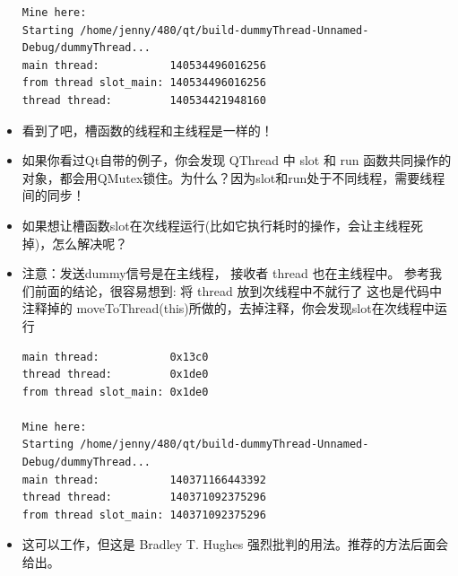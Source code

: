 \documentclass[9pt,b5paper]{article}
\begin{document}
\begin{itemize}
\begin{lstlisting}
Mine here:
Starting /home/jenny/480/qt/build-dummyThread-Unnamed-Debug/dummyThread...
main thread:           140534496016256 
from thread slot_main: 140534496016256 
thread thread:         140534421948160
\end{lstlisting}
\item 看到了吧，槽函数的线程和主线程是一样的！
\item 如果你看过Qt自带的例子，你会发现 QThread 中 slot 和 run 函数共同操作的对象，都会用QMutex锁住。为什么？因为slot和run处于不同线程，需要线程间的同步！
\item 如果想让槽函数slot在次线程运行(比如它执行耗时的操作，会让主线程死掉)，怎么解决呢？
\item 注意：发送dummy信号是在主线程， 接收者 thread 也在主线程中。 参考我们前面的结论，很容易想到: 将 thread 放到次线程中不就行了 这也是代码中注释掉的 moveToThread(this)所做的，去掉注释，你会发现slot在次线程中运行
\lstset{language=java,label= ,caption= ,numbers=none}
\begin{lstlisting}
main thread:           0x13c0 
thread thread:         0x1de0 
from thread slot_main: 0x1de0 

Mine here: 
Starting /home/jenny/480/qt/build-dummyThread-Unnamed-Debug/dummyThread...
main thread:           140371166443392 
thread thread:         140371092375296 
from thread slot_main: 140371092375296
\end{lstlisting}
\item 这可以工作，但这是 Bradley T. Hughes 强烈批判的用法。推荐的方法后面会给出。
\end{itemize}
\end{document}
